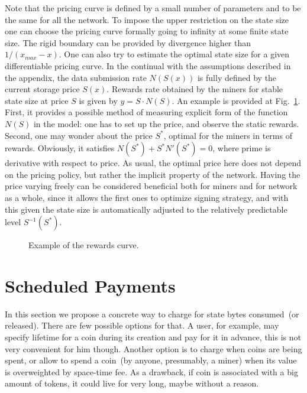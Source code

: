 \documentclass[]{llncs}   %
\newcommand{\authnote}[2]{\marginpar{\parbox{\marginparwidth}{\tiny %
  \textsf{#1 {\textcolor{blue}{notes: #2}}}}}%
  \textcolor{blue}{\textbf{\dag}}}
\newcommand{\authnote}[2]{
  \textsf{#1\textcolor{blue}{ #2}}}
\newcommand{\authnote}[2]{}
\newcommand{\knote}[1]{{\authnote{\textcolor{green}{Alex notes:}}{#1}}}
\begin{document}
Note that the pricing curve is defined by a small number of parameters and
to be the same for all the network. To impose the upper restriction on the state
size one can choose the pricing curve formally going to infinity at some finite
state size. The rigid boundary can be provided by divergence higher than
$1/(x_{max}-x)$. One can also try to estimate the optimal state size for a given
differentiable pricing curve. In the continual with the assumptions
described in the appendix, the data submission rate $N(S(x))$ is fully defined by the
current storage price $S(x)$.  Rewards rate obtained by the miners for stable
state size at price $S$ is given by $y = S \cdot N(S)$. An example is provided at
Fig.~\ref{fig:rewards}. First, it provides a possible method of measuring
explicit form of the function $N(S)$ in the model: one has to set up the price,
and observe the static rewards. Second, one may wonder about the price $S^*$,
optimal for the miners in terms of rewards. Obviously, it satisfies
$N(S^*)+S^*N'(S^*)=0$, where prime is derivative with respect to price. As
usual, the optimal price here does not depend on the pricing policy, but rather
the implicit property of the network. \knote{what does the last sentence mean?}  Having the price varying freely can be
considered beneficial both for miners and for network as a whole, since it
allows the first ones to optimize signing strategy, and with this given the
state size is automatically adjusted to the relatively predictable level
$S^{-1}(S^*)$.

\begin{figure}
    
    \caption{
        \label{fig:rewards} Example of the rewards curve.
    }
\end{figure}

\section{Scheduled Payments}

In this section we propose a concrete way to charge for state bytes consumed~(or released). There are few possible options for that. A user, for example, may specify lifetime for a coin during its creation and pay for it in advance, this is not very convenient for him though. Another option is to charge when coins are being spent, or allow to spend a coin~(by anyone, presumably, a miner) when its value is overweighted by space-time fee. As a drawback, if coin is associated with a big amount of tokens, it could live for very long, maybe without a reason. 
\end{document}
